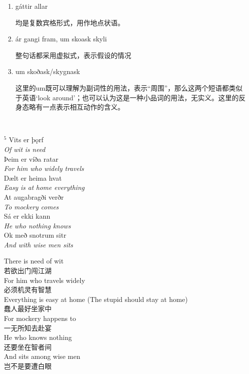 \begin{grammar*}{}
    \begin{enumerate}[leftmargin=*]
        \item gáttir allar

              均是复数宾格形式，用作地点状语。

        \item \'a\dh r gangi fram, um sko\dh ask skyli

              整句话都采用虚拟式，表示假设的情况

        \item um skoðask/skygnask

              这里的um既可以理解为副词性的用法，表示“周围”，那么这两个短语都类似于英语`look around'；也可以认为这是一种小品词的用法，无实义。这里的反身态略有一点表示相互动作的含义。

    \end{enumerate}
\end{grammar*}
\hspace*{\fill}\\ %
\begin{paracol}{2}
    \noindent
    $^5$ Vits er þǫrf\\
    \textit{Of wit is need}\\
    \MakeUppercase þeim er víða ratar\\
    \textit{For him who widely travels}\\
    Dælt er heima hvat\\
    \textit{Easy is at home everything}\\
    At augabragði verðr\\
    \textit{To mockery comes}\\
    Sá er ekki kann \\
    \textit{He who nothing knows}\\
    Ok með snotrum sitr\\
    \textit{And with wise men sits}\\

    \switchcolumn

    \noindent
    There is need of wit\\
    若欲出门闯江湖\\
    For him who travels widely\\
    必须机灵有智慧\\
    Everything is easy at home (The stupid should stay at home)\\
    蠢人最好坐家中\\
    For mockery happens to\\
    一无所知去赴宴\\
    He who knows nothing\\
    还要坐在智者间\\
    And sits among wise men\\
    岂不是要遭白眼\\
\end{paracol}

